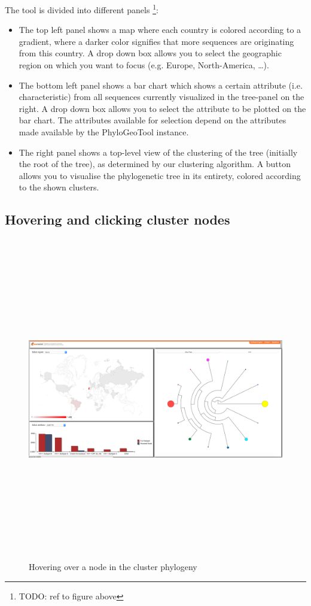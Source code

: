 \documentclass[a4paper, 11pt]{article} %
\begin{document}
The tool is divided into different panels \footnote{TODO: ref to figure above}: 
\begin{itemize}
  \item The top left panel shows a map where each country is colored according to a gradient, where a darker color signifies that more sequences are originating from this country. A drop down box allows you to select the geographic region on which you want to focus (e.g. Europe, North-America, \ldots).
  \item The bottom left panel shows a bar chart which shows a certain attribute (i.e. characteristic) from all sequences currently visualized in the tree-panel on the right. A drop down box allows you to select the attribute to be plotted on the bar chart. The attributes available for selection depend on the attributes made available by the PhyloGeoTool instance.
  \item The right panel shows a top-level view of the clustering of the tree (initially the root of the tree), as determined by our clustering algorithm. A button allows you to visualise the phylogenetic tree in its entirety, colored according to the shown clusters.
\end{itemize}

\subsection{Hovering and clicking cluster nodes}
\begin{figure}[H]
\centering
\includegraphics[width=400pt, height=400pt, keepaspectratio=true]{images/hover_node.PNG}
\caption{Hovering over a node in the cluster phylogeny}
\label{fig:hover_node}
\end{figure}
\end{document}
